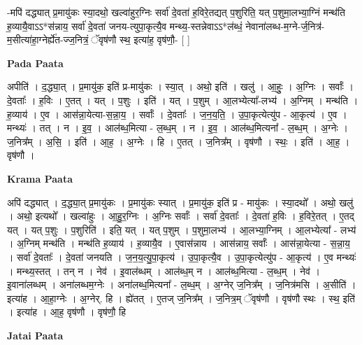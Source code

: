 \documentclass[17pt]{extarticle}
\begin{document}
-मपि॑ दद्ध्यात् प्र॒मायु॑कः स्या॒दथो॒ खल्वा॑हुर॒ग्निः सर्वा॑ दे॒वता॑ ह॒विरे॒तद्यत् प॒शुरिति॒ यत् प॒शुमा॒लभ्या॒ग्निं मन्थ॑ति ह॒व्यायै॒वाऽऽ*स॑न्नाय॒ सर्वा॑ दे॒वता॑ जनय-त्युपा॒कृत्यै॒व मन्थ्य॒-स्तन्नेवाऽऽ*ल॑ब्धं॒ नेवाना॑लब्ध-म॒ग्ने-र्ज॒नित्र॑-म॒सीत्या॑हा॒ग्नेर्ह्ये॑त-ज्ज॒नित्रं॒ ॅवृष॑णौ स्थ॒ इत्या॑ह॒ वृष॑णौ॒- [  ] \newline

\textbf{Pada Paata} \newline

अपीति॑ । द॒द्ध्या॒त् । प्र॒मायु॑क॒ इति॑ प्र-मायु॑कः । स्या॒त् । अथो॒ इति॑ । खलु॑ । आ॒हुः॒ । अ॒ग्निः । सर्वाः᳚ । दे॒वताः᳚ । ह॒विः । ए॒तत् । यत् । प॒शुः । इति॑ । यत् । प॒शुम् । आ॒लभ्येत्या᳚-लभ्य॑ । अ॒ग्निम् । मन्थ॑ति । ह॒व्याय॑ । ए॒व । आस॑न्ना॒येत्या-स॒न्ना॒य॒ । सर्वाः᳚ । दे॒वताः᳚ । ज॒न॒य॒ति॒ । उ॒पा॒कृत्येत्यु॑प - आ॒कृत्य॑ । ए॒व । मन्थ्यः॑ । तत् । न । इ॒व॒ । आल॑ब्ध॒मित्या - ल॒ब्ध॒म् । न । इ॒व॒ । आल॑ब्ध॒मित्यना᳚ - ल॒ब्ध॒म् । अ॒ग्नेः । ज॒नित्र᳚म् । अ॒सि॒ । इति॑ । आ॒ह॒ । अ॒ग्नेः । हि । ए॒तत् । ज॒नित्र᳚म् । वृष॑णौ । स्थः॒ । इति॑ । आ॒ह॒ । वृष॑णौ ।  \newline


\textbf{Krama Paata} \newline

अपि॑ दद्ध्यात् । द॒द्ध्या॒त् प्र॒मायु॑कः । प्र॒मायु॑कः स्यात् । प्र॒मायु॑क॒ इति॑ प्र - मायु॑कः । स्या॒दथो᳚ । अथो॒ खलु॑ । अथो॒ इत्यथो᳚ । खल्वा॑हुः । आ॒हु॒र॒ग्निः । अ॒ग्निः सर्वाः᳚ । सर्वा॑ दे॒वताः᳚ । दे॒वता॑ ह॒विः । ह॒विरे॒तत् । ए॒तद् यत् । यत् प॒शुः । प॒शुरिति॑ । इति॒ यत् । यत् प॒शुम् । प॒शुमा॒लभ्य॑ । आ॒लभ्या॒ग्निम् । आ॒लभ्येत्या᳚ - लभ्य॑ । अ॒ग्निम् मन्थ॑ति । मन्थ॑ति ह॒व्याय॑ । ह॒व्यायै॒व । ए॒वास॑न्नाय । आस॑न्नाय॒ सर्वाः᳚ । आस॑न्ना॒येत्या - स॒न्ना॒य॒ । सर्वा॑ दे॒वताः᳚ । दे॒वता॑ जनयति । ज॒न॒य॒त्यु॒पा॒कृत्य॑ । उ॒पा॒कृत्यै॒व । उ॒पा॒कृत्येत्यु॑प - आ॒कृत्य॑ । ए॒व मन्थ्यः॑ । मन्थ्य॒स्तत् । तन् न । नेव॑ । इ॒वाल॑ब्धम् । आल॑ब्ध॒म् न । आल॑ब्ध॒मित्या - ल॒ब्ध॒म् । नेव॑ । इ॒वाना॑लब्धम् । अना॑लब्धम॒ग्नेः । अना॑लब्ध॒मित्यना᳚ - ल॒ब्ध॒म् । अ॒ग्नेर् ज॒नित्र᳚म् । ज॒नित्र॑मसि । अ॒सीति॑ । इत्या॑ह । आ॒हा॒ग्नेः । अ॒ग्नेर्. हि । ह्ये॑तत् । ए॒तज् ज॒नित्र᳚म् । ज॒नित्र॒म् ॅवृष॑णौ । वृष॑णौ स्थः । स्थ॒ इति॑ । इत्या॑ह । आ॒ह॒ वृष॑णौ । वृष॑णौ॒ हि \newline

\textbf{Jatai Paata} \newline
\end{document}
